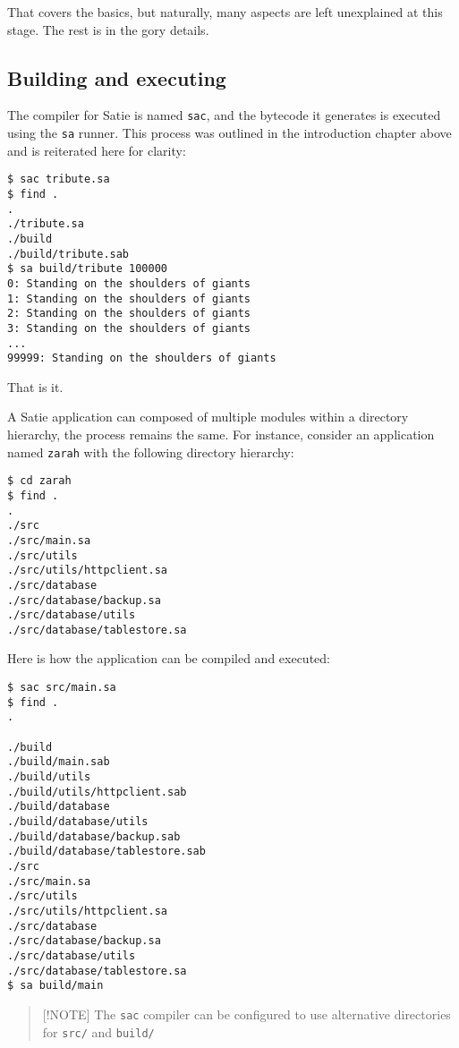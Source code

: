 That covers the basics, but naturally, many aspects are left unexplained
at this stage. The rest is in the gory details.

\hypertarget{building-and-executing}{%
\subsection{Building and executing}\label{building-and-executing}}

The compiler for Satie is named \texttt{sac}, and the bytecode it
generates is executed using the \texttt{sa} runner. This process was
outlined in the introduction chapter above and is reiterated here for
clarity:

\begin{verbatim}
$ sac tribute.sa
$ find .
.
./tribute.sa
./build
./build/tribute.sab
$ sa build/tribute 100000
0: Standing on the shoulders of giants
1: Standing on the shoulders of giants
2: Standing on the shoulders of giants
3: Standing on the shoulders of giants
...
99999: Standing on the shoulders of giants
\end{verbatim}

That is it.

A Satie application can composed of multiple modules within a directory
hierarchy, the process remains the same. For instance, consider an
application named \texttt{zarah} with the following directory hierarchy:

\begin{verbatim}
$ cd zarah
$ find .
.
./src
./src/main.sa
./src/utils
./src/utils/httpclient.sa
./src/database
./src/database/backup.sa
./src/database/utils
./src/database/tablestore.sa
\end{verbatim}

Here is how the application can be compiled and executed:

\begin{verbatim}
$ sac src/main.sa
$ find .
.

./build
./build/main.sab
./build/utils
./build/utils/httpclient.sab
./build/database
./build/database/utils
./build/database/backup.sab
./build/database/tablestore.sab
./src
./src/main.sa
./src/utils
./src/utils/httpclient.sa
./src/database
./src/database/backup.sa
./src/database/utils
./src/database/tablestore.sa
$ sa build/main
\end{verbatim}

\begin{quote}
{[}!NOTE{]} The \texttt{sac} compiler can be configured to use
alternative directories for \texttt{src/} and \texttt{build/}
\end{quote}

